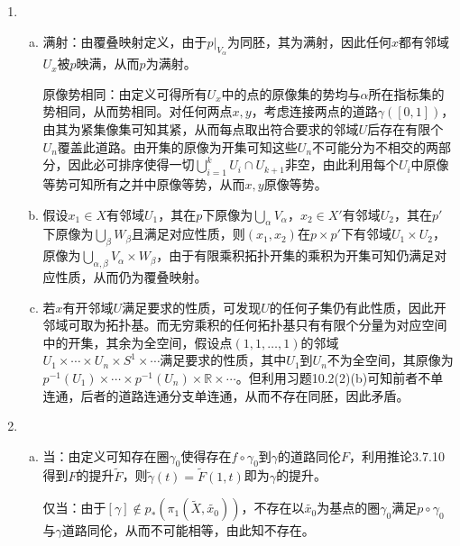 \documentclass[a4paper,UTF8,fontset=windows]{ctexart}
\begin{document}
\subsection{}
\begin{enumerate}[(1)]
    \item
    \begin{enumerate}[(a)]
    \item
    满射：由覆叠映射定义，由于$p|_{V_\alpha}$为同胚，其为满射，因此任何$x$都有邻域$U_x$被$p$映满，从而$p$为满射。
    
    原像势相同：由定义可得所有$U_x$中的点的原像集的势均与$\alpha$所在指标集的势相同，从而势相同。对任何两点$x,y$，考虑连接两点的道路$\gamma([0,1])$，由其为紧集像集可知其紧，从而每点取出符合要求的邻域$U$后存在有限个$U_n$覆盖此道路。由开集的原像为开集可知这些$U_n$不可能分为不相交的两部分，因此必可排序使得一切$\bigcup_{i=1}^kU_i\cap U_{k+1}$非空，由此利用每个$U_i$中原像等势可知所有之并中原像等势，从而$x,y$原像等势。
    
    \item
    假设$x_1\in X$有邻域$U_1$，其在$p$下原像为$\bigcup_\alpha V_\alpha$，$x_2\in X'$有邻域$U_2$，其在$p'$下原像为$\bigcup_\beta W_\beta$且满足对应性质，则$(x_1,x_2)$在$p\times p'$下有邻域$U_1\times U_2$，原像为$\bigcup_{\alpha,\beta}V_\alpha\times W_\beta$，由于有限乘积拓扑开集的乘积为开集可知仍满足对应性质，从而仍为覆叠映射。
    
    \item
    若$x$有开邻域$U$满足要求的性质，可发现$U$的任何子集仍有此性质，因此开邻域可取为拓扑基。而无穷乘积的任何拓扑基只有有限个分量为对应空间中的开集，其余为全空间，假设点$(1,1,\dots,1)$的邻域$U_1\times\cdots\times U_n\times S^1\times\cdots$满足要求的性质，其中$U_1$到$U_n$不为全空间，其原像为$p^{-1}(U_1)\times\cdots\times p^{-1}(U_n)\times\mathbb{R}\times\cdots$。但利用习题10.2(2)(b)可知前者不单连通，后者的道路连通分支单连通，从而不存在同胚，因此矛盾。
    \end{enumerate}
    
    \item
    \begin{enumerate}[(a)]
    \item
    当：由定义可知存在圈$\gamma_0$使得存在$f\circ\gamma_0$到$\gamma$的道路同伦$F$，利用推论3.7.10得到$F$的提升$\tilde{F}$，则$\tilde{\gamma}(t)=\tilde{F}(1,t)$即为$\gamma$的提升。
    
    仅当：由于$[\gamma]\notin p_*(\pi_1(\tilde{X},\tilde{x_0}))$，不存在以$\tilde{x_0}$为基点的圈$\gamma_0$满足$p\circ\gamma_0$与$\gamma$道路同伦，从而不可能相等，由此知不存在。
    

\end{enumerate}
\end{enumerate}
\end{document}
